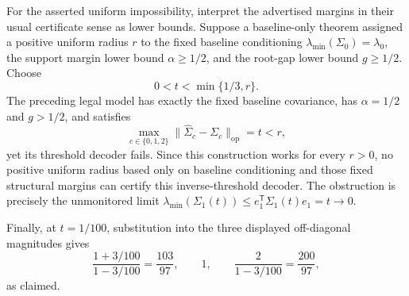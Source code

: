 For the asserted uniform impossibility, interpret the advertised margins in their usual certificate sense as lower bounds.  Suppose a baseline-only theorem assigned a positive uniform radius \(r\) to the fixed baseline conditioning \(\lambda_{\min}(\Sigma_0)=\lambda_0\), the support margin lower bound \(\alpha\ge1/2\), and the root-gap lower bound \(g\ge1/2\).  Choose
\[
 0<t<\min\{1/3,r\}.
\]
The preceding legal model has exactly the fixed baseline covariance, has \(\alpha=1/2\) and \(g>1/2\), and satisfies
\[
 \max_{c\in\{0,1,2\}}
 \|\widehat\Sigma_c-\Sigma_c\|_{\mathrm{op}}=t<r,
\]
yet its threshold decoder fails.  Since this construction works for every \(r>0\), no positive uniform radius based only on baseline conditioning and those fixed structural margins can certify this inverse-threshold decoder.  The obstruction is precisely the unmonitored limit \(\lambda_{\min}(\Sigma_1(t))\le e_1^{\mathsf T}\Sigma_1(t)e_1=t\to0\).

Finally, at \(t=1/100\), substitution into the three displayed off-diagonal magnitudes gives
\[
 \frac{1+3/100}{1-3/100}=\frac{103}{97},\qquad
 1,\qquad
 \frac{2}{1-3/100}=\frac{200}{97},
\]
as claimed.
